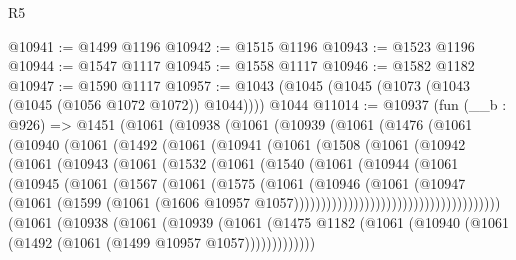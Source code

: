 \begin{lexlean}{R5}
\begin{coremodule}
@10941 := @1499 @1196
@10942 := @1515 @1196
@10943 := @1523 @1196
@10944 := @1547 @1117
@10945 := @1558 @1117
@10946 := @1582 @1182
@10947 := @1590 @1117
@10957 := @1043 (@1045 (@1045 (@1073 (@1043 (@1045 (@1056 @1072 @1072)) @1044)))) @1044
@11014 := @10937
    (fun (__b : @926) =>
    @1451
      (@1061
        (@10938
          (@1061
            (@10939
              (@1061
                (@1476
                  (@1061
                    (@10940
                      (@1061
                        (@1492
                          (@1061
                            (@10941
                              (@1061
                                (@1508
                                  (@1061
                                    (@10942
                                      (@1061
                                        (@10943
                                          (@1061
                                            (@1532
                                              (@1061
                                                (@1540
                                                  (@1061
                                                    (@10944
                                                      (@1061
                                                        (@10945
                                                          (@1061
                                                            (@1567
                                                              (@1061
                                                                (@1575
                                                                  (@1061
                                                                    (@10946
                                                                      (@1061
                                                                        (@10947
                                                                          (@1061
                                                                            (@1599
                                                                              (@1061
                                                                                (@1606
                                                                                  @10957
                                                                                  @1057))))))))))))))))))))))))))))))))))))))
      (@1061
        (@10938
          (@1061
            (@10939
              (@1061
                (@1475 @1182 (@1061 (@10940 (@1061 (@1492 (@1061 (@1499 @10957 @1057)))))))))))))

\end{coremodule}
\end{lexlean}
